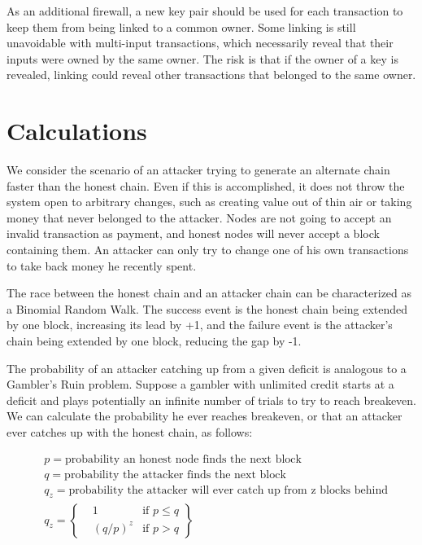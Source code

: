 \documentclass{article}
\begin{document}


As an additional firewall, a new key pair should be used for each transaction to keep them from being linked to a common
owner.
Some linking is still unavoidable with multi-input transactions,
which necessarily reveal that their inputs were owned by the same owner.
The risk is that if the owner of a key is revealed,
linking could reveal other transactions that belonged to the same owner.

\section{Calculations}\label{sec:calculations}
We consider the scenario of an attacker trying to generate an alternate chain faster than the honest
chain. Even if this is accomplished, it does not throw the system open to arbitrary changes, such
as creating value out of thin air or taking money that never belonged to the attacker. Nodes are
not going to accept an invalid transaction as payment, and honest nodes will never accept a block
containing them. An attacker can only try to change one of his own transactions to take back
money he recently spent.

The race between the honest chain and an attacker chain can be characterized as a Binomial
Random Walk. The success event is the honest chain being extended by one block, increasing its
lead by +1, and the failure event is the attacker's chain being extended by one block, reducing the
gap by -1.

The probability of an attacker catching up from a given deficit is analogous to a Gambler's
Ruin problem. Suppose a gambler with unlimited credit starts at a deficit and plays potentially an
infinite number of trials to try to reach breakeven. We can calculate the probability he ever
reaches breakeven, or that an attacker ever catches up with the honest chain, as follows\cite{fellerintroduction}:

\[
    \begin{aligned}
        & p = \text{probability an honest node finds the next block} \\
        & q = \text{probability the attacker finds the next block} \\
        & q_z = \text{probability the attacker will ever catch up from z blocks behind} \\
        & q_z = \left\{\begin{aligned}
                &1 & \text{if } p \le q \\
                &{(q / p)}^z & \text{if } p > q
                \end{aligned}\right\}
    \end{aligned}
\]
\end{document}
